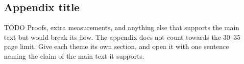\appendix
\chapter*{\fuggelek}
\setcounter{chapter}{\appendixnumber}

\printlists

\section{Appendix title}\label{app:first}
TODO Proofs, extra measurements, and anything else that supports the main text but would break its flow. The appendix does not count towards the 30--35 page limit. Give each theme its own section, and open it with one sentence naming the claim of the main text it supports.

